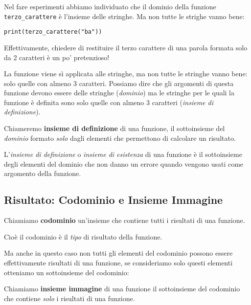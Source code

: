 Nel fare esperimenti abbiamo individuato che il dominio della 
funzione \texttt{terzo\_carattere} è l'insieme delle stringhe. Ma non tutte 
le strighe vanno bene:

\begin{lstlisting}
print(terzo_carattere("ba"))
\end{lstlisting}

Effettivamente, chiedere di restituire il terzo carattere di una parola 
formata solo da 2 caratteri è un po' pretenzioso!

La funzione viene sì applicata alle stringhe, ma non 
tutte le stringhe vanno bene: solo quelle con almeno 3 caratteri. 
Possiamo dire che gli argomenti di questa funzione devono essere delle 
stringhe (\emph{dominio}) ma le stringhe per le quali la funzione è 
definita sono solo quelle con almeno 3 caratteri 
(\emph{insieme di definizione}).

\begin{definizione}
Chiameremo \textbf{insieme di definizione}  di una funzione, il 
sottoinsieme del \emph{dominio} formato \emph{solo} dagli elementi che 
permettono di 
calcolare un risultato.
\end{definizione}

L'\emph{insieme di definizione} o \emph{insieme di esistenza} di una 
funzione è il sottoinsieme degli elementi del dominio che non danno un 
errore quando vengono usati come argomento della funzione.

\subsection{Risultato: Codominio e Insieme Immagine}
\label{sec:funzioni2_codominio}

\begin{definizione}
Chiamiamo \textbf{codominio} un'insieme che contiene tutti i risultati di 
una funzione.
\end{definizione}

Cioè il codominio è il \emph{tipo} di risultato della funzione.

Ma anche in questo caso non tutti gli elementi del codominio possono essere 
effettivamente risultati di una funzione, se consideriamo solo questi 
elementi otteniamo un sottoinsieme del codominio:

\begin{definizione}
Chiamiamo \textbf{insieme immagine} di una funzione il sottoinsieme del 
codominio che contiene \emph{solo} i risultati di una funzione.
\end{definizione}

